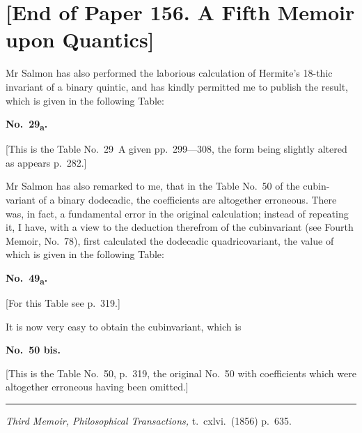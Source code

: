 \documentclass[11pt,a4paper]{article}
\begin{document}
\noindent\hrulefill

\section*{[End of Paper 156. A Fifth Memoir upon Quantics]}

Mr Salmon has also performed the laborious calculation of Hermite's 18-thic
invariant of a binary quintic, and has kindly permitted me to publish the result, which
is given in the following Table:

\begin{center}\textbf{No.~29\textsubscript{a}.}\end{center}

[This is the Table No.~29~A given pp.~299---308, the form being slightly
altered as appears p.~282.]

Mr Salmon has also remarked to me, that in the Table No.~50 of the cubin-
variant of a binary dodecadic, the coefficients are altogether erroneous. There was, in
fact, a fundamental error in the original calculation; instead of repeating it, I have,
with a view to the deduction therefrom of the cubinvariant (see Fourth Memoir,
No.~78), first calculated the dodecadic quadricovariant, the value of which is given in
the following Table:

\begin{center}\textbf{No.~49\textsubscript{a}.}\end{center}

[For this Table see p.~319.]

It is now very easy to obtain the cubinvariant, which is

\begin{center}\textbf{No.~50 bis.}\end{center}

[This is the Table No.~50, p.~319, the original No.~50 with coefficients which
were altogether erroneous having been omitted.]

\medskip
\noindent\rule{0.3\textwidth}{0.4pt}

\begin{flushright}
\textit{Third Memoir, Philosophical Transactions,} t.~cxlvi.~(1856) p.~635.
\end{flushright}

\vspace{2em}
\noindent\hrulefill
\end{document}
